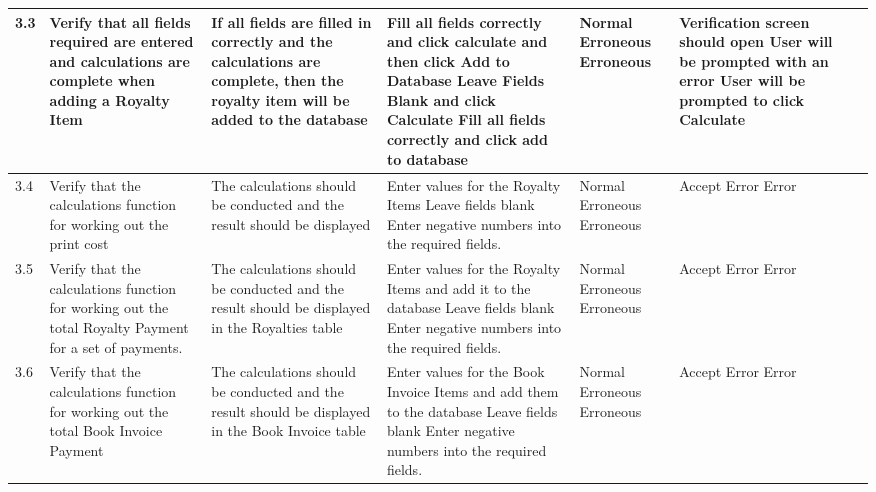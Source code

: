 \begin{landscape}
\begin{center}
\begin{longtable}{|p{1.5cm}|p{2cm}|p{2.5cm}|p{2.5cm}|p{2cm}|p{2cm}|p{2cm}|p{2cm}|}
        3.3 & Verify that all fields required are entered and calculations are complete when adding a Royalty Item & If all fields are filled in correctly and the calculations are complete, then the royalty item will be added to the database & Fill all fields correctly and click calculate and then click Add to Database \newline Leave Fields Blank and click Calculate \newline Fill all fields correctly and click add to database & Normal \newline Erroneous \newline Erroneous & Verification screen should open \newline User will be prompted with an error \newline User will be prompted to click Calculate & & \\ \hline
\rowcolor{lightgray} 3.4 & Verify that the calculations function for working out the print cost & The calculations should be conducted and the result should be displayed & Enter values for the Royalty Items \newline Leave fields blank \newline Enter negative numbers into the required fields. & Normal \newline Erroneous \newline Erroneous & Accept \newline Error \newline Error & & \\ \hline 
\rowcolor{lightgray} 3.5 & Verify that the calculations function for working out the total Royalty Payment for a set of payments. & The calculations should be conducted and the result should be displayed in the Royalties table & Enter values for the Royalty Items and add it to the database \newline Leave fields blank \newline Enter negative numbers into the required fields. & Normal \newline Erroneous \newline Erroneous & Accept \newline Error \newline Error & & \\ \hline 
\rowcolor{lightgray} 3.6 & Verify that the calculations function for working out the total Book Invoice Payment & The calculations should be conducted and the result should be displayed in the Book Invoice table & Enter values for the Book Invoice Items and add them to the database \newline Leave fields blank \newline Enter negative numbers into the required fields. & Normal \newline Erroneous \newline Erroneous & Accept \newline Error \newline Error & & \\ \hline 

\end{longtable}
\end{center}
\end{landscape}
